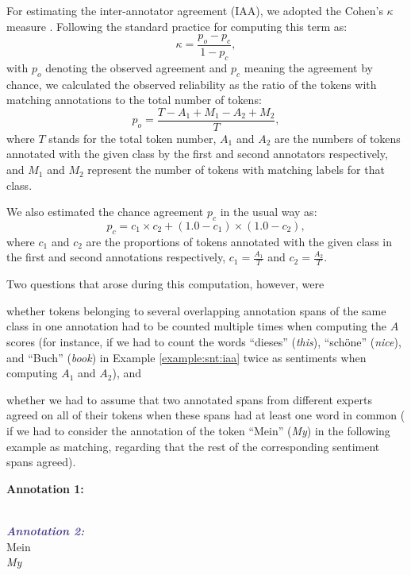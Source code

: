 For estimating the inter-annotator agreement (IAA), we adopted the
Cohen's $\kappa$ measure \cite{Cohen:60}.  Following the standard
practice for computing this term as:
\begin{equation*}
  \kappa = \frac{p_o - p_c}{1 - p_c},
\end{equation*}
with $p_o$ denoting the observed agreement and $p_c$ meaning the
agreement by chance, we calculated the observed reliability as the
ratio of the tokens with matching annotations to the total number of
tokens:
\begin{equation*}
  p_o = \frac{T - A_1 + M_1 - A_2 + M_2}{T},
\end{equation*}
where $T$ stands for the total token number, $A_1$ and $A_2$ are the
numbers of tokens annotated with the given class by the first and
second annotators respectively, and $M_1$ and $M_2$ represent the
number of tokens with matching labels for that class.

We also estimated the chance agreement $p_c$ in the usual way as:
\begin{equation*}\textstyle
  p_c = c_1 \times c_2 + (1.0 - c_1) \times (1.0 - c_2),
\end{equation*}
where $c_1$ and $c_2$ are the proportions of tokens annotated with the
given class in the first and second annotations respectively, \ie{}
$c_1 = \frac{A_1}{T}$ and $c_2 = \frac{A_2}{T}$.

Two questions that arose during this computation, however, were
\begin{inparaenum}[(i)]
  \item whether tokens belonging to several overlapping annotation
    spans of the same class in one annotation had to be counted
    multiple times when computing the $A$ scores (for instance, if we
    had to count the words ``dieses'' (\textit{this}), ``sch\"one''
    (\textit{nice}), and ``Buch'' (\textit{book}) in Example
    \ref{example:snt:iaa} twice as sentiments when computing $A_1$ and
    $A_2$), and
  \item whether we had to assume that two annotated spans from
    different experts agreed on all of their tokens when these spans
    had at least one word in common (\eg{} if we had to consider the
    annotation of the token ``Mein'' (\textit{My}) in the following
    example as matching, regarding that the rest of the corresponding
    sentiment spans agreed).
\end{inparaenum}

\begin{example}\label{example:snt:iaa}
\textcolor{red3}{\textbf{Annotation 1:}}\\
\upshape{}\\

\noindent\textcolor{darkslateblue}{\textbf{\itshape Annotation 2:}}\\
Mein \\
\itshape My \upshape{}
\end{example}

